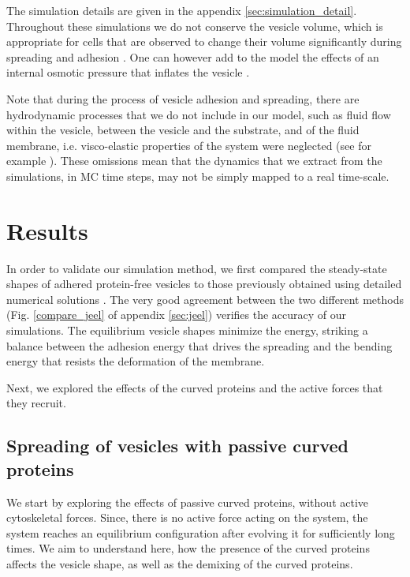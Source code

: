 \documentclass[pre,amsmath]{revtex4}
\begin{document}
The simulation details are given in the appendix \ref{sec:simulation_detail}. Throughout these simulations we do not conserve the vesicle volume, which is appropriate for cells that are observed to change their volume significantly during spreading and adhesion \cite{guo2017cell,xie2018controlling}. One can however add to the model the effects of an internal osmotic pressure that inflates the vesicle \cite{miha2019}.

Note that during the process of vesicle adhesion and spreading, there are hydrodynamic processes that we do not include in our model, such as fluid flow within the vesicle, between the vesicle and the substrate, and of the fluid membrane, i.e. visco-elastic properties of the system were neglected  (see for example \cite{bernard2000strong}). These omissions mean that the dynamics that we extract from the simulations, in MC time steps, may not be simply mapped to a real time-scale.
 
\section{Results} 
In order to validate our simulation method, we first compared the steady-state shapes of adhered protein-free vesicles to those previously obtained using detailed numerical solutions \cite{raval2020shape,bibissidis2020}. The very good agreement between the two different methods (Fig. \ref{compare_jeel} of appendix \ref{sec:jeel}) verifies the accuracy of our simulations. The equilibrium vesicle shapes minimize the energy, striking a balance between the adhesion energy that drives the spreading and the bending energy that resists the deformation of the membrane.

Next, we explored the effects of the curved proteins and the active forces that they recruit.

\label{sec:results}
\subsection{Spreading of vesicles with passive curved proteins}

We start by exploring the effects of passive curved proteins, without active cytoskeletal forces.  Since, there is no active force acting on the system, the system reaches an  equilibrium configuration after evolving it for sufficiently long times. We aim to understand here, how the presence of the curved proteins affects the vesicle shape, as well as the demixing of the curved proteins. 
\end{document}
